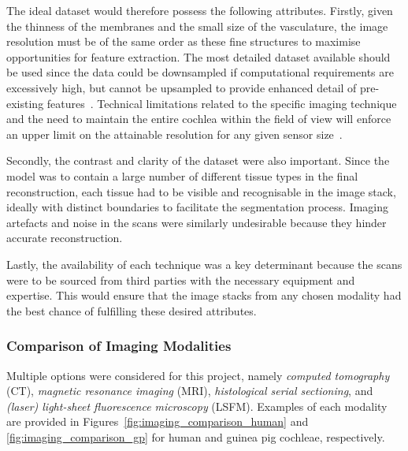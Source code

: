 The ideal dataset would therefore possess the following attributes. Firstly,
given the thinness of the membranes and the small size of the vasculature, the
image resolution must be of the same order as these fine structures to maximise
opportunities for feature extraction. The most detailed dataset available should
be used since the data could be downsampled if computational requirements are
excessively high, but cannot be upsampled to provide enhanced detail of
pre-existing features~\cite{schimpf1998}. Technical limitations related to the
specific imaging technique and the need to maintain the entire cochlea within
the field of view will enforce an upper limit on the attainable resolution for
any given sensor size~\cite{poznyakovskiy2008}.

Secondly, the contrast and clarity of the dataset were also important. Since the
model was to contain a large number of different tissue types in the final
reconstruction, each tissue had to be visible and recognisable in the image
stack, ideally with distinct boundaries to facilitate the segmentation process.
Imaging artefacts and noise in the scans were similarly undesirable because
they hinder accurate reconstruction.

Lastly, the availability of each technique was a key determinant because the
scans were to be sourced from third parties with the necessary equipment and
expertise. This would ensure that the image stacks from any chosen modality
had the best chance of fulfilling these desired attributes.

\subsubsection{Comparison of Imaging Modalities}

Multiple options were considered for this project, namely \emph{computed
tomography} (CT), \emph{magnetic resonance imaging} (MRI), \emph{histological
serial sectioning}, and \emph{(laser) light-sheet fluorescence microscopy}
(LSFM). Examples of each modality are provided in
Figures~\ref{fig:imaging_comparison_human} and \ref{fig:imaging_comparison_gp}
for human and guinea pig cochleae, respectively.

